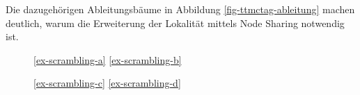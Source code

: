 \noindent Die dazugehörigen Ableitungsbäume in Abbildung \ref{fig-ttmctag-ableitung} machen deutlich, warum die Erweiterung der Lokalität mittels Node Sharing notwendig ist. 
\begin{figure}[t]
\begin{center}
\ref{ex-scrambling-a}
\hfil
\ref{ex-scrambling-b}


\vspace{5ex}

\ref{ex-scrambling-c}
\hfil
\ref{ex-scrambling-d}



\end{center}
\end{figure}
